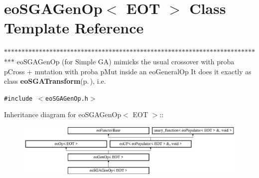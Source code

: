 \section{eo\-SGAGen\-Op$<$ EOT $>$ Class Template Reference}
\label{classeo_s_g_a_gen_op}
$\ast$$\ast$$\ast$$\ast$$\ast$$\ast$$\ast$$\ast$$\ast$$\ast$$\ast$$\ast$$\ast$$\ast$$\ast$$\ast$$\ast$$\ast$$\ast$$\ast$$\ast$$\ast$$\ast$$\ast$$\ast$$\ast$$\ast$$\ast$$\ast$$\ast$$\ast$$\ast$$\ast$$\ast$$\ast$$\ast$$\ast$$\ast$$\ast$$\ast$$\ast$$\ast$$\ast$$\ast$$\ast$$\ast$$\ast$$\ast$$\ast$$\ast$$\ast$$\ast$$\ast$$\ast$$\ast$$\ast$$\ast$$\ast$$\ast$$\ast$$\ast$$\ast$$\ast$$\ast$$\ast$$\ast$$\ast$$\ast$$\ast$$\ast$$\ast$$\ast$$\ast$$\ast$$\ast$ eo\-SGAGen\-Op (for Simple GA) mimicks the usual crossover with proba p\-Cross + mutation with proba p\-Mut inside an eo\-General\-Op It does it exactly as class {\bf eo\-SGATransform}{\rm (p.\,\pageref{classeo_s_g_a_transform})}, i.e.  


{\tt \#include $<$eo\-SGAGen\-Op.h$>$}

Inheritance diagram for eo\-SGAGen\-Op$<$ EOT $>$::\begin{figure}[H]
\begin{center}
\leavevmode
\includegraphics[height=2.54835cm]{classeo_s_g_a_gen_op}
\end{center}
\end{figure}
